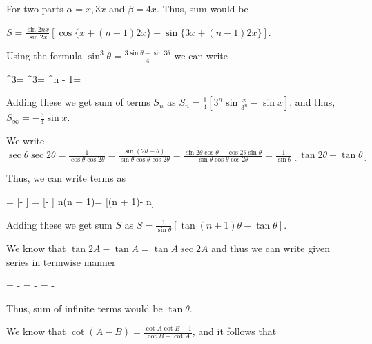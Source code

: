  For two parts $\alpha = x, 3x$ and $\beta = 4x$. Thus, sum would be

  $S = \frac{\sin2nx}{\sin2x}[\cos\{x + (n - 1)2x\} - \sin\{3x + (n - 1)2x\}]$.
\item Using the formula $\sin^3\theta = \frac{3\sin\theta - \sin3\theta}{4}$ we can write

  \startformula\startalign
    \NC \sin^3\NC = \NR
    \sin^3\NC = \NR
    \NC \NC \cdots\NR
    ^{n - 1}\sin{}\NC = 
  \stopalign\stopformula

  Adding these we get sum of terms $S_n$ as $S_n = \frac{1}{4}\left[3^n\sin\frac{x}{3^n} - \sin x\right]$,
  and thus, $S_\infty = -\frac{3}{4}\sin x$.
\item We write $\sec\theta\sec2\theta = \frac{1}{\cos\theta\cos2\theta} = \frac{\sin(2\theta -
  \theta)}{\sin\theta\cos\theta\cos2\theta} = \frac{\sin2\theta\cos\theta -
  \cos2\theta\sin\theta}{\sin\theta\cos\theta\cos2\theta} = \frac{1}{\sin\theta}[\tan2\theta - \tan\theta]$

  Thus, we can write terms as

  \startformula\startalign
    \NC \sec\theta{}\theta \NC = [\theta - \tan\theta]\NR
    \NC {}\theta{}\theta \NC = [\theta - \theta]\NR
    \NC\NC \cdots \NR
    \NC \sec n\theta\sec(n + 1)\theta \NC = [\tan(n + 1)\theta - \tan n\theta]\NR
  \stopalign\stopformula

  Adding these we get sum $S$ as $S = \frac{1}{\sin\theta}[\tan(n + 1)\theta - \tan\theta]$.
\item We know that $\tan2A - \tan A = \tan A\sec2A$ and thus we can write given series in termwise manner

  \startformula\startalign
    \NC \tan{}\sec\theta \NC = \tan\theta - \tan{}\NR
    \NC \tan{}\sec{} \NC = \tan{} - \tan{}\NR
    \NC \tan{}\sec{} \NC = \tan{} - \tan{}\NR
    \NC\NC \cdots \NR
  \stopalign\stopformula

  Thus, sum of infinite terms would be $\tan\theta$.
\item We know that $\cot(A - B) = \frac{\cot A\cot B + 1}{\cot B - \cot A}$, and it follows that

